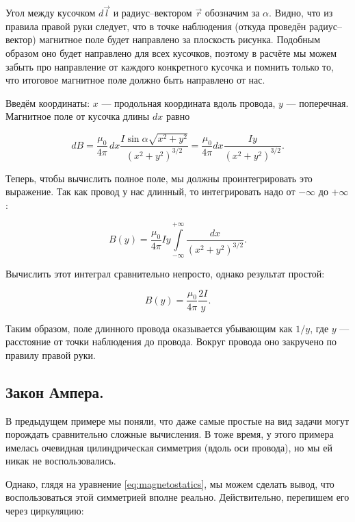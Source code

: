 \documentclass[a4paper,12pt]{article}
\numberwithin{equation}{section}
\begin{document}
Угол между кусочком $d\vec{l}$ и радиус--вектором $\vec{r}$ обозначим
за $\alpha$. Видно, что из правила правой руки следует, что в точке
наблюдения (откуда проведён радиус--вектор) магнитное поле будет
направлено за плоскость рисунка. Подобным образом оно будет направлено
для всех кусочков, поэтому в расчёте мы можем забыть про направление
от каждого конкретного кусочка и помнить только то, что итоговое
магнитное поле должно быть направлено от нас. 

Введём координаты: $x$ --- продольная координата вдоль провода,
$y$ --- поперечная. Магнитное поле от кусочка длины $dx$ равно

\begin{equation}
  \label{eq:wire_current_1}
  dB = \frac{\mu_{0}}{4\pi}\,dx \frac{I \sin \alpha
    \sqrt{x^2+y^2}}{\left(x^2+y^2\right)^{3/2}} = \frac{\mu_0}{4\pi} dx \frac{I
  y}{\left(x^2+y^2\right)^{3/2}}.
\end{equation}

Теперь, чтобы вычислить полное поле, мы должны проинтегрировать это
выражение. Так как провод у нас длинный, то интегрировать надо от
$-\infty$ до $+\infty$: 

\begin{equation}
  \label{eq:wire_current_2}
  B(y) = \frac{\mu_0}{4\pi} Iy \int\limits_{-\infty}^{+\infty} \frac{dx}{\left(x^2+y^2\right)^{3/2}} .
\end{equation}

Вычислить этот интеграл сравнительно непросто, однако результат простой: 

\begin{equation}
  \label{eq:wire_current_3}
  B(y) = \frac{\mu_0}{4\pi} \frac{2I}{y}.
\end{equation}

Таким образом, поле длинного провода оказывается убывающим как $1/y$,
где $y$ --- расстояние от точки наблюдения до провода. Вокруг провода
оно закручено по правилу правой руки. 

\subsection{Закон Ампера.}
\label{sec:amperes_law}

В предыдущем примере мы поняли, что даже самые простые на вид задачи
могут порождать сравнительно сложные вычисления. В тоже время, у этого
примера имелась очевидная цилиндрическая симметрия (вдоль оси
провода), но мы ей никак не воспользовались. 

Однако, глядя на уравнение \eqref{eq:magnetostatics}, мы можем сделать
вывод, что воспользоваться этой симметрией вполне
реально. Действительно, перепишем его через циркуляцию: 
\end{document}
